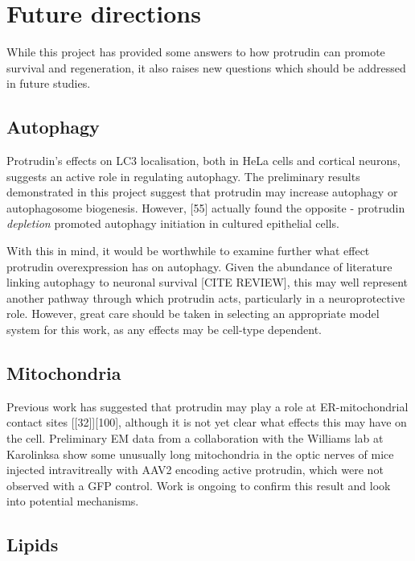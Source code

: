 \documentclass[
  12pt,
  a4paper,
]{book}
\begin{document}
\hypertarget{future-directions}{%
\section{Future directions}\label{future-directions}}

While this project has provided some answers to how protrudin can promote survival and regeneration, it also raises new questions which should be addressed in future studies.

\hypertarget{autophagy}{%
\subsection{Autophagy}\label{autophagy}}

Protrudin's effects on LC3 localisation, both in HeLa cells and cortical neurons, suggests an active role in regulating autophagy. The preliminary results demonstrated in this project suggest that protrudin may increase autophagy or autophagosome biogenesis. However, {[}55{]} actually found the opposite - protrudin \emph{depletion} promoted autophagy initiation in cultured epithelial cells.

With this in mind, it would be worthwhile to examine further what effect protrudin overexpression has on autophagy. Given the abundance of literature linking autophagy to neuronal survival {[}CITE REVIEW{]}, this may well represent another pathway through which protrudin acts, particularly in a neuroprotective role. However, great care should be taken in selecting an appropriate model system for this work, as any effects may be cell-type dependent.

\hypertarget{mitochondria-1}{%
\subsection{Mitochondria}\label{mitochondria-1}}

Previous work has suggested that protrudin may play a role at ER-mitochondrial contact sites {[}{[}32{]}{]}{[}100{]}, although it is not yet clear what effects this may have on the cell. Preliminary EM data from a collaboration with the Williams lab at Karolinksa show some unusually long mitochondria in the optic nerves of mice injected intravitreally with AAV2 encoding active protrudin, which were not observed with a GFP control. Work is ongoing to confirm this result and look into potential mechanisms.

\hypertarget{lipids}{%
\subsection{Lipids}\label{lipids}}
\end{document}
